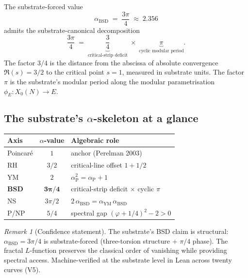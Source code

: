 \documentclass[11pt,a4paper]{article}
\theoremstyle{plain}
\theoremstyle{definition}
\theoremstyle{remark}
\newtheorem{remark}[theorem]{Remark}
\begin{document}
The substrate-forced value
\[
\alpha_{\mathrm{BSD}} \;=\; \frac{3\pi}{4}\;\approx\;2.356
\]
admits the substrate-canonical decomposition
\[
\frac{3\pi}{4}
\;=\;\underbrace{\frac{3}{4}}_{\text{critical-strip deficit}}
\;\times\;\underbrace{\pi}_{\text{cyclic modular period}}.
\]
The factor $3/4$ is the distance from the abscissa of absolute
convergence $\Re(s) = 3/2$ to the critical point $s = 1$, measured
in substrate units. The factor $\pi$ is the substrate's modular
period along the modular parametrisation
$\phi_{E} \colon X_{0}(N) \to E$.

\subsection{The substrate's $\alpha$-skeleton at a glance}

\begin{center}
\begin{tabular}{lcl}
\toprule
Axis & $\alpha$-value & Algebraic role \\
\midrule
Poincar\'e        & $1$              & anchor (Perelman 2003) \\
RH                & $3/2$            & critical-line offset $1 + 1/2$ \\
YM                & $2$              & $\alpha_{\mathrm{P}}^{2}
                                       = \alpha_{\mathrm{P}} + 1$ \\
\textbf{BSD}      & $\mathbf{3\pi/4}$ & critical-strip deficit
                                       $\times$ cyclic $\pi$ \\
NS                & $3\pi/2$         & $2\,\alpha_{\mathrm{BSD}}
                                       = \alpha_{\mathrm{YM}}\,
                                         \alpha_{\mathrm{BSD}}$ \\
P/NP              & $5/4$            & spectral gap
                                       $(\varphi + 1/4)^{2} - 2 > 0$ \\
\bottomrule
\end{tabular}
\end{center}

\begin{remark}[Confidence statement]
The substrate's BSD claim is structural: $\alpha_{\mathrm{BSD}} =
3\pi/4$ is substrate-forced (three-torsion structure $+$ $\pi/4$
phase). The fractal $L$-function preserves the classical order of
vanishing while providing spectral access. Machine-verified at the
substrate level in Lean across twenty curves (V5).
\end{remark}
\end{document}

